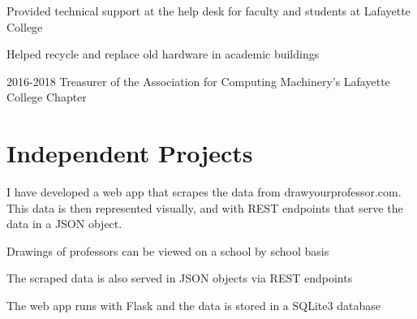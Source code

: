 \documentclass[letterpaper]{deedy-resume} %
\begin{document}
\begin{minipage}[t]{0.64\textwidth}
\sectionspace %





\begin{tightitemize}
\item Provided technical support at the help desk for faculty and students at Lafayette College
\item Helped recycle and replace old hardware in academic buildings
\end{tightitemize}

\sectionspace

\begin{tightitemize}
\item 2016-2018 Treasurer of the Association for Computing Machinery's 
Lafayette College Chapter \\
\end{tightitemize}

\sectionspace



\section{Independent Projects}

I have developed a web app that scrapes the data from drawyourprofessor.com. This data is then represented visually, and with REST endpoints that serve the data in a JSON object.
\begin{tightitemize}
\item Drawings of professors can be viewed on a school by school basis
\item The scraped data is also served in JSON objects via REST endpoints
\item The web app runs with Flask and the data is stored in a SQLite3 database
\end{tightitemize}



\end{minipage}
\end{document}
